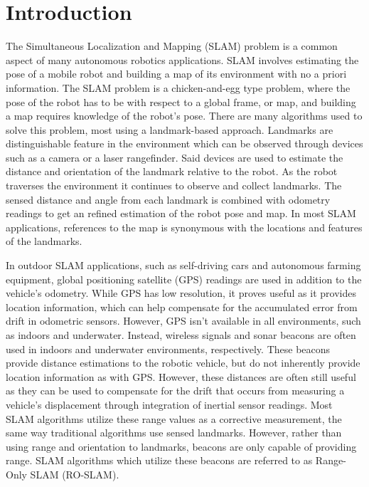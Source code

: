 \documentclass[conference]{IEEEtran}
\begin{document}
	\section{Introduction} 
		The Simultaneous Localization and Mapping (SLAM) problem is a common aspect of many autonomous robotics applications. SLAM involves estimating the pose of a mobile robot and building a map of its environment with no a priori information. The SLAM problem is a chicken-and-egg type problem, where the pose of the robot has to be with respect to a global frame, or map, and building a map requires knowledge of the robot's pose. There are many algorithms used to solve this problem, most using a landmark-based approach. Landmarks are distinguishable feature in the environment which can be observed through devices such as a camera or a laser rangefinder. Said devices are used to estimate the distance and orientation of the landmark relative to the robot. As the robot traverses the environment it continues to observe and collect landmarks. The sensed distance and angle from each landmark is combined with odometry readings to get an refined estimation of the robot pose and map. 
		In most SLAM applications, references to the map is synonymous with the locations and features of the landmarks.
	
		In outdoor SLAM applications, such as self-driving cars and autonomous farming equipment, global positioning satellite (GPS) readings are used in addition to the vehicle's odometry. While GPS has low resolution, it proves useful as it provides location information, which can help compensate for the accumulated error from drift in odometric sensors. However, GPS isn't available in all environments, such as indoors and underwater. Instead, wireless signals and sonar beacons are often used in indoors and underwater environments, respectively. These beacons provide distance estimations to the robotic vehicle, but do not inherently provide location information as with GPS. However, these distances are often still useful as they can be used to compensate for the drift that occurs from measuring a vehicle's displacement through integration of inertial sensor readings. Most SLAM algorithms utilize these range values as a corrective measurement, the same way traditional algorithms use sensed landmarks. However, rather than using range and orientation to landmarks, beacons are only capable of providing range. SLAM algorithms which utilize these beacons are referred to as Range-Only SLAM (RO-SLAM). 
		
\end{document}
